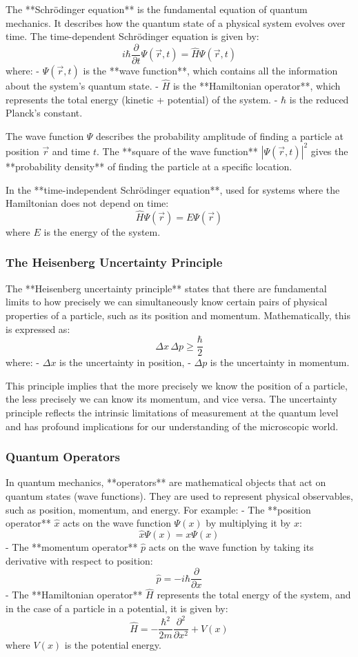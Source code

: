 \documentclass{article}
\begin{document}
The **Schrödinger equation** is the fundamental equation of quantum mechanics. It describes how the quantum state of a physical system evolves over time. The time-dependent Schrödinger equation is given by:
\[
i \hbar \frac{\partial}{\partial t} \Psi(\vec{r}, t) = \hat{H} \Psi(\vec{r}, t)
\]
where:
- \( \Psi(\vec{r}, t) \) is the **wave function**, which contains all the information about the system's quantum state.
- \( \hat{H} \) is the **Hamiltonian operator**, which represents the total energy (kinetic + potential) of the system.
- \( \hbar \) is the reduced Planck's constant.

The wave function \( \Psi \) describes the probability amplitude of finding a particle at position \( \vec{r} \) and time \( t \). The **square of the wave function** \( |\Psi(\vec{r}, t)|^2 \) gives the **probability density** of finding the particle at a specific location.

In the **time-independent Schrödinger equation**, used for systems where the Hamiltonian does not depend on time:
\[
\hat{H} \Psi(\vec{r}) = E \Psi(\vec{r})
\]
where \( E \) is the energy of the system.

\subsubsection*{The Heisenberg Uncertainty Principle}

The **Heisenberg uncertainty principle** states that there are fundamental limits to how precisely we can simultaneously know certain pairs of physical properties of a particle, such as its position and momentum. Mathematically, this is expressed as:
\[
\Delta x \, \Delta p \geq \frac{\hbar}{2}
\]
where:
- \( \Delta x \) is the uncertainty in position,
- \( \Delta p \) is the uncertainty in momentum.

This principle implies that the more precisely we know the position of a particle, the less precisely we can know its momentum, and vice versa. The uncertainty principle reflects the intrinsic limitations of measurement at the quantum level and has profound implications for our understanding of the microscopic world.

\subsubsection*{Quantum Operators}

In quantum mechanics, **operators** are mathematical objects that act on quantum states (wave functions). They are used to represent physical observables, such as position, momentum, and energy. For example:
- The **position operator** \( \hat{x} \) acts on the wave function \( \Psi(x) \) by multiplying it by \( x \):
  \[
  \hat{x} \Psi(x) = x \Psi(x)
  \]
- The **momentum operator** \( \hat{p} \) acts on the wave function by taking its derivative with respect to position:
  \[
  \hat{p} = -i \hbar \frac{\partial}{\partial x}
  \]
- The **Hamiltonian operator** \( \hat{H} \) represents the total energy of the system, and in the case of a particle in a potential, it is given by:
  \[
  \hat{H} = -\frac{\hbar^2}{2m} \frac{\partial^2}{\partial x^2} + V(x)
  \]
  where \( V(x) \) is the potential energy.
\end{document}
